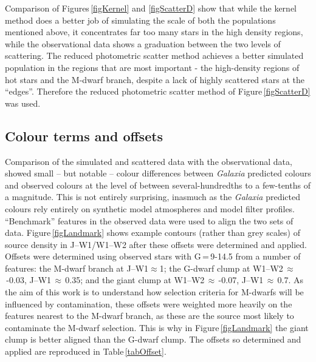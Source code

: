 Comparison of Figures\,\ref{figKernel} and \ref{figScatterD} show that while the kernel method does a better job of simulating the scale of both the populations mentioned above, it concentrates far too many stars in the high density regions, while the observational data shows a graduation between the two levels of scattering. The reduced photometric scatter method achieves a better simulated population in the regions that are most important - the high-density regions of hot stars and the M-dwarf branch, despite a lack of highly scattered stars at the ``edges''. Therefore the reduced photometric scatter method of Figure\,\ref{figScatterD} was used.
\subsection{Colour terms and offsets}
\label{secOff}
Comparison of the simulated and scattered data with the observational data, showed small -- but notable -- colour differences between {\em Galaxia} predicted colours and observed colours at the level of between several-hundredths to a few-tenths of a magnitude. This is not entirely surprising, inasmuch as the {\em Galaxia} predicted colours rely entirely on synthetic model atmospheres and model filter profiles. \\

``Benchmark'' features in the observed data were used to align the two sets of data. Figure\,\ref{figLandmark} shows example contours (rather than grey scales) of source density in J--W1/W1--W2 after these offsets were determined and applied. Offsets were determined using observed stars with G\,=\,9-14.5 from a number of features: the M-dwarf branch at J--W1$\approx$1; the G-dwarf clump at W1--W2\,$\approx$\,-0.03, J--W1\,$\approx$\,0.35; and the giant clump at W1--W2\,$\approx$\,-0.07, J--W1\,$\approx$\,0.7. As the aim of this work is to understand how selection criteria for M-dwarfs will be influenced by contamination, these offsets were weighted more heavily on the features nearest to the M-dwarf branch, as these are the source most likely to contaminate the M-dwarf selection. This is why in Figure\,\ref{figLandmark} the giant clump is better aligned than the G-dwarf clump. The offsets so determined and applied are reproduced in Table\,\ref{tabOffset}.\\

